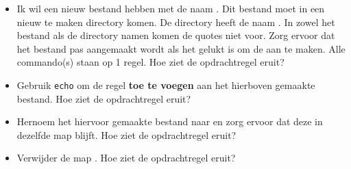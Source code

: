 \begin{itemize}
\item Ik wil een nieuw bestand hebben met de naam . Dit bestand moet in een nieuw te maken directory komen. De directory heeft de naam . In zowel het bestand als de directory namen komen de quotes niet voor. Zorg ervoor dat het bestand pas aangemaakt wordt als het gelukt is om de  aan te maken. Alle commando(s) staan op 1 regel. Hoe ziet de opdrachtregel eruit?
\item Gebruik \texttt{echo} om de regel  \textbf{toe te voegen} aan het hierboven gemaakte bestand. Hoe ziet de opdrachtregel eruit?
\item Hernoem het hiervoor gemaakte bestand naar  en zorg ervoor dat deze in dezelfde map blijft. Hoe ziet de opdrachtregel eruit?
\item Verwijder de map . Hoe ziet de opdrachtregel eruit?
\end{itemize}

